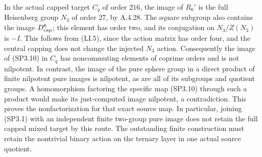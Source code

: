 In the actual capped target $C_q$ of order $216$, the image
of $R_0'$ is the full Heisenberg group $N_3$ of order
$27$, by A.4.28.  The square subgroup also contains the
image $D_{\rm cap}^6$; this element has order two, and its
conjugation on $N_3/Z(N_3)$ is $-I$.  This follows from
(LI.5), since the action matrix has order four, and the
central capping does not change the injected $N_3$ action.
Consequently the image of (SP3.10) in $C_q$ has
noncommuting elements of coprime orders and is not nilpotent.
In contrast, the image of the pure sphere group in a direct
product of finite nilpotent pure images is nilpotent, as are
all of its subgroups and quotient groups.  A homomorphism
factoring the specific map (SP3.10) through such a product
would make its just-computed image nilpotent, a contradiction.
This proves the nonfactorization for that exact source map.
In particular, joining (SP3.1) with an independent finite
two-group pure image does not retain the full capped mixed
target by this route.  The outstanding finite construction
must retain the nontrivial binary action on the ternary
layer in one actual source quotient.
